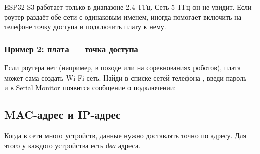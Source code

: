 \begin{caution}
ESP32-S3 работает только в диапазоне 2,4~ГГц. Сеть 5~ГГц он не увидит. Если роутер раздаёт обе сети с
одинаковым именем, иногда помогает включить на телефоне точку доступа и подключить плату к нему.
\end{caution}

\subsubsection{Пример 2: плата --- точка доступа}

Если роутера нет (например, в походе или на соревнованиях роботов), плата может сама создать
Wi-Fi сеть. Найди в списке сетей телефона , введи пароль  --- и в
Serial Monitor появится сообщение о подключении:


\subsection{MAC-адрес и IP-адрес}

Когда в сети много устройств, данные нужно доставлять точно по адресу. Для этого у каждого
устройства есть \emph{два} адреса.

